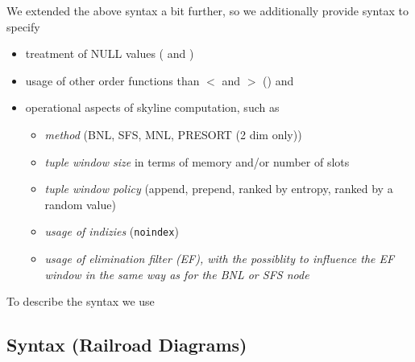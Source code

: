 We extended the above syntax a bit further, so we additionally provide syntax to specify
\begin{itemize}
\item treatment of NULL values ( and )
\item usage of other order functions than $<$ and $>$ () and
\item operational aspects of skyline computation, such as 

\begin{itemize}
\item \emph{method} (BNL, SFS, MNL, PRESORT (2 dim only))
\item \emph{tuple window size} in terms of memory and/or number of slots
\item \emph{tuple window policy} (append, prepend, ranked by entropy, ranked by a random value)
\item \emph{usage of indizies} (\texttt{noindex})
\item \emph{usage of elimination filter (EF), with the possiblity to influence the EF window in the same way as for the BNL or SFS node}
\end{itemize}

\end{itemize}

To describe the syntax we use 
\subsection{Syntax (Railroad Diagrams)}


\railtermfont{\ttfamily\upshape\small}
\railboxheight 12pt
\railinit

